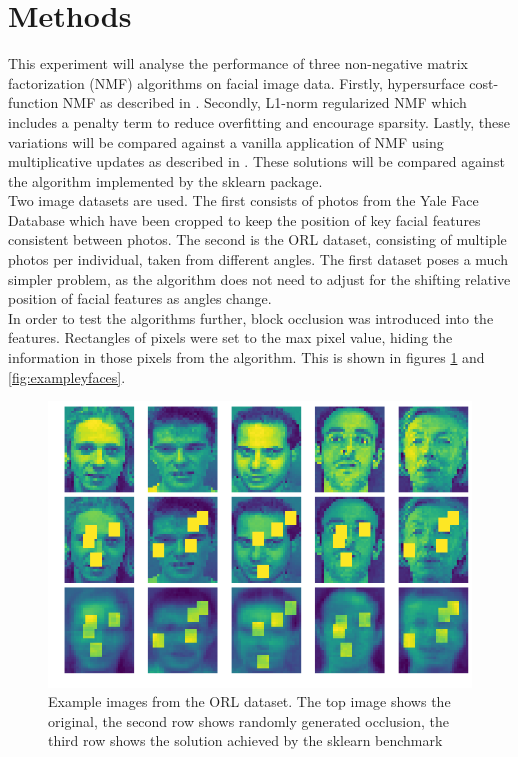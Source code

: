 \documentclass{article} %
\begin{document}
\section{Methods}

This experiment will analyse the performance of three non-negative matrix factorization (NMF) algorithms on facial image data. Firstly, hypersurface cost-function NMF as described in \cite{Hamza2006}. Secondly, L1-norm regularized NMF which includes a penalty term to reduce overfitting and encourage sparsity. Lastly, these variations will be compared against a vanilla application of NMF using multiplicative updates as described in \cite{NIPS2000_1861}. These solutions will be compared against the algorithm implemented by the sklearn package.\\

Two image datasets are used. The first consists of photos from the Yale Face Database which have been cropped to keep the position of key facial features consistent between photos. The second is the ORL dataset, consisting of multiple photos per individual, taken from different angles. The first dataset poses a much simpler problem, as the algorithm does not need to adjust for the shifting relative position of facial features as angles change.\\

In order to test the algorithms further, block occlusion was introduced into the features. Rectangles of pixels were set to the max pixel value, hiding the information in those pixels from the algorithm. This is shown in figures \ref{fig:exampleofaces} and \ref{fig:exampleyfaces}.\\

\begin{figure}[h]
  \includegraphics[width=\textwidth]{sklearn_orl_occluded_learn}
  \caption{Example images from the ORL dataset. The top image shows the original, the second row shows randomly generated occlusion, the third row shows the solution achieved by the sklearn benchmark}
  \label{fig:exampleofaces}
\end{figure}
\end{document}
